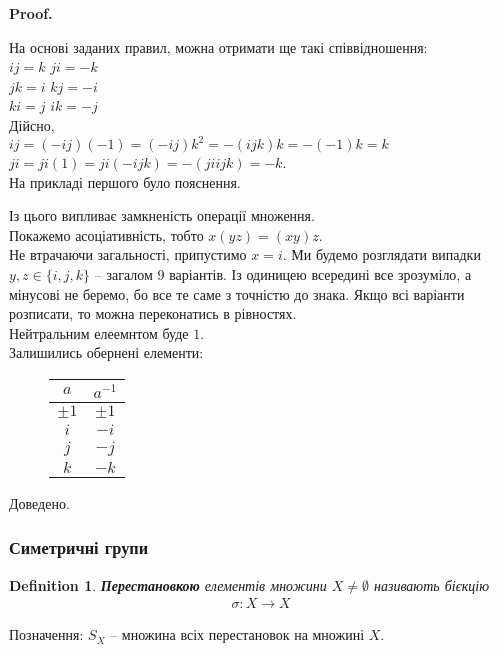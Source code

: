 \documentclass[a4paper, 10pt]{article}
\makeatletter
\theoremstyle{theoremdd}
\theoremstyle{theoremdd}
\newtheorem{definition}[theorem]{Definition}
\theoremstyle{theoremdd}
\theoremstyle{theoremdd}
\theoremstyle{theoremdd}
\theoremstyle{theoremdd}
\theoremstyle{theoremdd}
\theoremstyle{theoremdd}
\theoremstyle{theoremdd}
\theoremstyle{theoremdd}
\theoremstyle{theoremdd}
\theoremstyle{theoremdd}
\theoremstyle{theoremdd}
\theoremstyle{theoremdd}
\theoremstyle{theoremdd}
\renewenvironment{proof}[1][Proof.\\]{\par
\pushQED{\hfill \qed}%
\normalfont \topsep6\p@\@plus6\p@\relax
\trivlist
\item\relax
{\bfseries
#1\@addpunct{.}}\hspace\labelsep\ignorespaces
}{%
\popQED\endtrivlist\@endpefalse
}
\makeatother
\begin{document}
\begin{proof}
На основі заданих правил, можна отримати ще такі співвідношення:\\
$ij = k$ \hspace{1cm} $ji = -k$\\
$jk = i$ \hspace{1cm} $kj = -i$\\
$ki = j$ \hspace{1cm} $ik = -j$\\
Дійсно, \\
$ij = (-ij) (-1) = (-ij) k^2 = -(ijk)k = -(-1)k = k$\\
$ji = ji (1) = ji (-ijk) = -(ji ijk) = -k$.\\
На прикладі першого було пояснення.
\begin{figure}[H]
\centering
{}
\end{figure}
Із цього випливає замкненість операції множення.\\
Покажемо асоціативність, тобто $x(yz) = (xy)z$.\\
Не втрачаючи загальності, припустимо $x = i$. Ми будемо розглядати випадки $y,z \in \{i,j,k\}$ -- загалом $9$ варіантів. Із одиницею всередині все зрозуміло, а мінусові не беремо, бо все те саме з точністю до знака. Якщо всі варіанти розписати, то можна переконатись в рівностях.\\
Нейтральним елеемнтом буде $1$.\\
Залишились обернені елементи:
\begin{figure}[H]
\centering
\begin{tabular}{c|c}
$a$ & $a^{-1}$ \\
\hline
$\pm 1$ & $\pm 1$ \\
$i$ & $-i$ \\
$j$ & $-j$ \\
$k$ & $-k$
\end{tabular}
\end{figure}
Доведено.
\end{proof}

\subsubsection{Симетричні групи}
\begin{definition}
\textbf{Перестановкою} елементів множини $X \neq \emptyset$ називають бієкцію 
\begin{align*}
\sigma \colon X \to X
\end{align*}
\end{definition}
Позначення: $S_X$ -- множина всіх перестановок на множині $X$.
\end{document}
